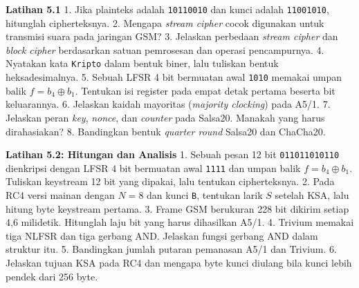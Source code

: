 
\begin{obereflection}
\textbf{Latihan 5.1}
1. Jika plainteks adalah \texttt{10110010} dan kunci adalah \texttt{11001010}, hitunglah cipherteksnya.
2. Mengapa \textit{stream cipher} cocok digunakan untuk transmisi suara pada jaringan GSM?
3. Jelaskan perbedaan \textit{stream cipher} dan \textit{block cipher} berdasarkan satuan pemrosesan dan operasi pencampurnya.
4. Nyatakan kata \texttt{Kripto} dalam bentuk biner, lalu tuliskan bentuk heksadesimalnya.
5. Sebuah LFSR 4 bit bermuatan awal \texttt{1010} memakai umpan balik $f=b_4\oplus b_1$. Tentukan isi register pada empat detak pertama beserta bit keluarannya.
6. Jelaskan kaidah mayoritas (\textit{majority clocking}) pada A5/1.
7. Jelaskan peran \textit{key}, \textit{nonce}, dan \textit{counter} pada Salsa20. Manakah yang harus dirahasiakan?
8. Bandingkan bentuk \textit{quarter round} Salsa20 dan ChaCha20.
\end{obereflection}

\begin{obereflection}
\textbf{Latihan 5.2: Hitungan dan Analisis}
1. Sebuah pesan 12 bit \texttt{011011010110} dienkripsi dengan LFSR 4 bit bermuatan awal \texttt{1111} dan umpan balik $f=b_4\oplus b_1$. Tuliskan keystream 12 bit yang dipakai, lalu tentukan cipherteksnya.
2. Pada RC4 versi mainan dengan $N=8$ dan kunci \texttt{B}, tentukan larik $S$ setelah KSA, lalu hitung byte keystream pertama.
3. Frame GSM berukuran 228 bit dikirim setiap 4,6 milidetik. Hitunglah laju bit yang harus dihasilkan A5/1.
4. Trivium memakai tiga NLFSR dan tiga gerbang AND. Jelaskan fungsi gerbang AND dalam struktur itu.
5. Bandingkan jumlah putaran pemanasan A5/1 dan Trivium.
6. Jelaskan tujuan KSA pada RC4 dan mengapa byte kunci diulang bila kunci lebih pendek dari 256 byte.
\end{obereflection}
